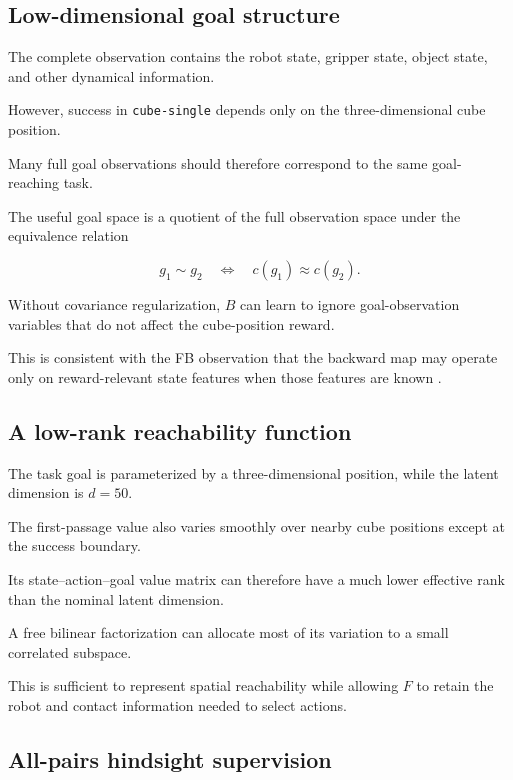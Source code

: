 \documentclass[11pt]{article}
\theoremstyle{remark}
\begin{document}
\subsection{Low-dimensional goal structure}

The complete observation contains the robot state, gripper state, object state, and other dynamical information.

However, success in \texttt{cube-single} depends only on the three-dimensional cube position.

Many full goal observations should therefore correspond to the same goal-reaching task.

The useful goal space is a quotient of the full observation space under the equivalence relation

\begin{equation}
g_1\sim g_2\quad\Longleftrightarrow\quad c(g_1)\approx c(g_2).
\label{eq:goal-equivalence}
\end{equation}

Without covariance regularization, $B$ can learn to ignore goal-observation variables that do not affect the cube-position reward.

This is consistent with the FB observation that the backward map may operate only on reward-relevant state features when those features are known \citep{touati2021learning}.

\subsection{A low-rank reachability function}

The task goal is parameterized by a three-dimensional position, while the latent dimension is $d=50$.

The first-passage value also varies smoothly over nearby cube positions except at the success boundary.

Its state--action--goal value matrix can therefore have a much lower effective rank than the nominal latent dimension.

A free bilinear factorization can allocate most of its variation to a small correlated subspace.

This is sufficient to represent spatial reachability while allowing $F$ to retain the robot and contact information needed to select actions.

\subsection{All-pairs hindsight supervision}
\end{document}
